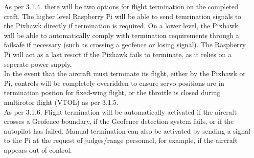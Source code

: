 As per 3.1.4. there will be two options for flight termination on the completed craft. The higher level Raspberry Pi will be able to send temrination signals to the Pixhawk directly if termination is required.  On a lower level, the Pixhawk will be able to automatically comply with termination requirements through a failsafe if necessary (such as crossing a geofence or losing signal). The Raspberry Pi will act as a last resort if the Pixhawk fails to terminate, as it relies on a seperate power supply.\\

In the event that the aircraft must terminate its flight, either by the Pixhawk or Pi, controls will be completely overridden to ensure servo positions are in termination positon for fixed-wing flight, or the throttle is closed during multirotor flight (VTOL) as per 3.1.5.\\

As per 3.1.6. Flight termination will be automatically activated if the aircraft crosses a Geofence boundary, if the Geofence detection system fails, or if the autopilot has failed. Manual termination can also be activated by sending a signal to the Pi at the request of judges/range personnel, for example, if the aircraft appears out of control.